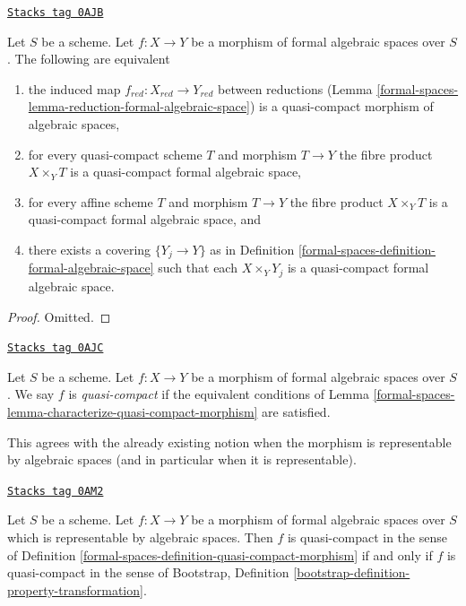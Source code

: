 \begin{lemma}
\label{formal-spaces-lemma-characterize-quasi-compact-morphism}
\href{https://stacks.math.columbia.edu/tag/0AJB}{\texttt{Stacks tag 0AJB}}

Let $S$ be a scheme. Let $f : X \to Y$ be a morphism of formal algebraic
spaces over $S$. The following are equivalent
\begin{enumerate}
\item the induced map $f_{red} : X_{red} \to Y_{red}$ between reductions
(Lemma \ref{formal-spaces-lemma-reduction-formal-algebraic-space}) is a quasi-compact
morphism of algebraic spaces,
\item for every quasi-compact scheme $T$ and morphism $T \to Y$
the fibre product $X \times_Y T$ is a quasi-compact formal
algebraic space,
\item for every affine scheme $T$ and morphism $T \to Y$
the fibre product $X \times_Y T$ is a quasi-compact formal
algebraic space, and
\item there exists a covering $\{Y_j \to Y\}$ as in
Definition \ref{formal-spaces-definition-formal-algebraic-space}
such that each $X \times_Y Y_j$ is a quasi-compact formal algebraic space.
\end{enumerate}
\end{lemma}

\begin{proof}
Omitted.
\end{proof}

\begin{definition}
\label{formal-spaces-definition-quasi-compact-morphism}
\href{https://stacks.math.columbia.edu/tag/0AJC}{\texttt{Stacks tag 0AJC}}

Let $S$ be a scheme. Let $f : X \to Y$ be a morphism of
formal algebraic spaces over $S$.
We say $f$ is {\it quasi-compact} if the equivalent conditions of
Lemma \ref{formal-spaces-lemma-characterize-quasi-compact-morphism} are satisfied.
\end{definition}

This agrees with the already existing notion when the morphism
is representable by algebraic spaces (and in particular when it is
representable).

\begin{lemma}
\label{formal-spaces-lemma-quasi-compact-representable}
\href{https://stacks.math.columbia.edu/tag/0AM2}{\texttt{Stacks tag 0AM2}}

Let $S$ be a scheme. Let $f : X \to Y$ be a morphism of formal algebraic
spaces over $S$ which is representable by algebraic spaces.
Then $f$ is quasi-compact in the sense of
Definition \ref{formal-spaces-definition-quasi-compact-morphism}
if and only if $f$ is quasi-compact in the sense of
Bootstrap, Definition \ref{bootstrap-definition-property-transformation}.
\end{lemma}

